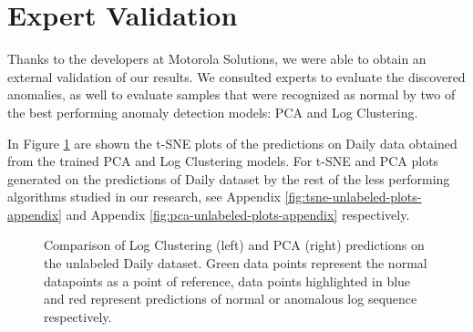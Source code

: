 \section{Expert Validation}

Thanks to the developers at Motorola Solutions, we were able to obtain an external validation of our results. We consulted experts to evaluate the discovered anomalies, as well to evaluate samples that were recognized as normal by two of the best performing anomaly detection models: PCA and Log Clustering.

In Figure \ref{fig:tsne-unlabeled-plots} are shown the t-SNE plots of the predictions on Daily data obtained from the trained PCA and Log Clustering models. For t-SNE and PCA plots generated on the predictions of Daily dataset by the rest of the less performing algorithms studied in our research, see Appendix \ref{fig:tsne-unlabeled-plots-appendix} and Appendix \ref{fig:pca-unlabeled-plots-appendix} respectively. 
\begin{figure}%
    \centering
    \qquad
    \caption{Comparison of Log Clustering (left) and PCA (right) predictions on the unlabeled Daily dataset. Green data points represent the normal datapoints as a point of reference, data points highlighted in blue and red represent predictions of normal or anomalous log sequence respectively.}%
    \label{fig:tsne-unlabeled-plots}%
\end{figure}

